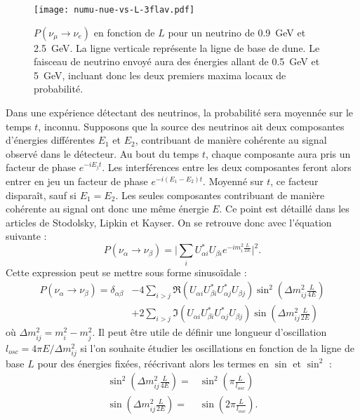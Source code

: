         \begin{figure}[htpb]
          \centering
          \texttt{[image: numu-nue-vs-L-3flav.pdf]}
          \caption[$P(\nu_{\mu}\to\nu_e)$ en fonction de $L$]{\label{fig::3flavors_oscillations}$P(\nu_{\mu}\to\nu_e)$ en fonction de $L$ pour un neutrino de \SI{0.9}{\giga\electronvolt} et \SI{2.5}{\giga\electronvolt}. La ligne verticale représente la ligne de base de \gls{dune}. Le faisceau de neutrino envoyé aura des énergies allant de \SI{0.5}{\giga\electronvolt} et \SI{5}{\giga\electronvolt}, incluant donc les deux premiers maxima locaux de probabilité.}
        \end{figure}
        Dans une expérience détectant des neutrinos, la probabilité sera moyennée sur le temps $t$, inconnu. Supposons que la source des neutrinos ait deux composantes d'énergies différentes $E_1$ et $E_2$, contribuant de manière cohérente au signal observé dans le détecteur. Au bout du temps $t$, chaque composante aura pris un facteur de phase $e^{-iE_jt}$. Les interférences entre les deux composantes feront alors entrer en jeu un facteur de phase $e^{-i(E_1-E_2)t}$. Moyenné sur $t$, ce facteur disparaît, sauf si $E_1 = E_2$. Les seules composantes contribuant de manière cohérente au signal ont donc une même énergie $E$. Ce point est détaillé dans les articles de Stodolsky\cite{Stodolsky1998}, Lipkin\cite{Lipkin2005} et Kayser\cite{Kayser2005}. On se retrouve donc avec l'équation suivante : 
        \begin{equation*}
          P(\nu_{\alpha}\to\nu_{\beta}) = \bigg|\sum_i U_{\alpha i}^*U_{\beta i} e^{-im_i^2\frac{L}{2E}}\bigg|^2.
        \end{equation*}
        Cette expression peut se mettre sous forme sinusoïdale\cite{Mondal2015} :
        \begin{equation}\label{eq::proba_oscillation}
          \begin{split}
            P(\nu_{\alpha}\to\nu_{\beta}) = \delta_{\alpha\beta} & - 4\sum_{i>j}\Re(U_{\alpha i}U_{\beta i}^*U_{\alpha j}^*U_{\beta j})\sin^2\left(\Delta m_{ij}^2\frac{L}{4E}\right) \\
            & +2\sum_{i>j}\Im(U_{\alpha i}U_{\beta i}^*U_{\alpha j}^*U_{\beta j})\sin\left(\Delta m_{ij}^2\frac{L}{2E}\right)
          \end{split}
        \end{equation}
        où $\Delta m_{ij}^2 = m_i^2-m_j^2$. Il peut être utile de définir une longueur d'oscillation $l_{osc} = 4\pi E/\Delta m_{ij}^2$ si l'on souhaite étudier les oscillations en fonction de la ligne de base $L$ pour des énergies fixées, réécrivant alors les termes en $\sin$ et $\sin^2$ :
        \begin{eqnarray}
          \sin^2\left(\Delta m_{ij}^2\frac{L}{4E}\right) = &  \sin^2\left(\pi\frac{L}{l_{osc}}\right) \\
          \sin\left(\Delta m_{ij}^2\frac{L}{2E}\right) = & \sin\left(2\pi\frac{L}{l_{osc}}\right).
        \end{eqnarray}
        

